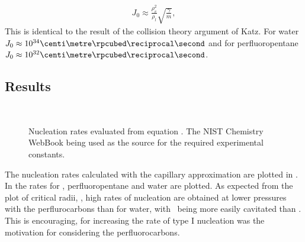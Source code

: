 %
%
\begin{align}
  J_0 \approx \frac{\rho_v^2}{\rho_l}\sqrt{\frac{\gamma}{m}},
\end{align}
This is identical to the result of the collision theory argument of Katz\cite{Katz1992}.
For water $J_0\approx 10^{34}\centi\metre \rpcubed \reciprocal\second$ and for perfluoropentane $J_0\approx 10^{32}\centi\metre \rpcubed \reciprocal\second$. 




\subsection{Results}

\begin{figure}
 \centering
  \\
  \caption{
    Nucleation rates evaluated from equation .  The NIST Chemistry WebBook\cite{NISTdata} being used as the source for the required  experimental constants.
  }
 \label{fig:cnt:rate}
\end{figure}


The nucleation rates calculated with the capillary approximation are plotted in .
In  the rates   for \pfb,  perfluoropentane and water are plotted.
As expected from the plot of critical radii, , 
high rates of nucleation are obtained at lower pressures with the perflurocarbons than for water,
with \pfb\ being more easily cavitated than \pfp.
This is encouraging, for increasing the rate of type I nucleation was the motivation for considering the perfluorocarbons.


